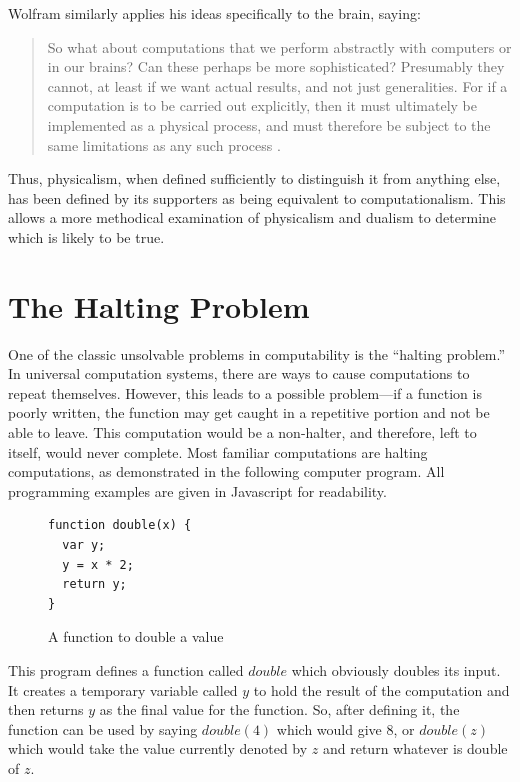 Wolfram similarly applies his ideas specifically to the brain, saying:

\begin{quote}
So what about computations that we perform abstractly with computers or in our brains?  Can these perhaps be more sophisticated?  Presumably they cannot, at least if we want  actual results, and not just generalities.  For if a computation is to be carried out explicitly, then it must ultimately be implemented as a physical process, and must therefore be subject to the same limitations as any such process \citep[][p.~721]{wolfram2002}.
\end{quote}

Thus, physicalism, when defined sufficiently to distinguish it from anything else, has been defined by its supporters as being equivalent to computationalism.  This allows a more methodical examination of physicalism and dualism to determine which is likely to be true.

\section{The Halting Problem}

One of the classic unsolvable problems in computability is the ``halting problem.''  In universal computation systems, there are ways to cause computations to repeat themselves.  However, this leads to a possible problem---if a function is poorly written, the function may get caught in a repetitive portion and not be able to leave.  This computation would be a non-halter, and therefore, left to itself, would never complete.  Most familiar computations are halting computations, as demonstrated in the following computer program. All programming examples are given in Javascript for readability.

\begin{figure}[H]
\begin{mdframed}
\begin{verbatim}
function double(x) {
  var y;
  y = x * 2;
  return y;
}
\end{verbatim}
\end{mdframed}
\caption{A function to double a value}
\end{figure}

This program defines a function called $double$ which obviously doubles its input.  It creates a temporary variable called $y$ to hold the result of the computation and then returns $y$ as the final value for the function.  So, after defining it, the function can be used by saying $double(4)$ which would give $8$, or $double(z)$ which would take the value currently denoted by $z$ and return whatever is double of $z$.

